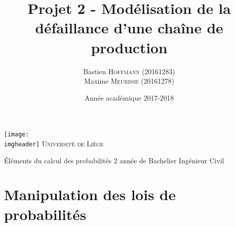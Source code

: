 \documentclass[a4paper, 12pt]{article}
\title{Projet 2 - Modélisation de la défaillance d'une chaîne de production}
\author{Bastien \textsc{Hoffmann} (20161283)\\Maxime \textsc{Meurisse} (20161278)\\}
\date{Année académique 2017-2018}
\newcommand{\imgheader}{resources/pdf/logo-uliege.pdf}
\newcommand{\institution}{Université de Liège}
\newcommand{\subtitle}{Éléments du calcul des probabilités}
\newcommand{\context}{2\ieme{} année de Bachelier Ingénieur Civil}
\begin{document}
	\makeatletter
	\begin{titlepage}
		\begin{minipage}[t][0.425\textheight][t]{\textwidth}
			\begin{center}
				\texttt{[image: \\imgheader]}
				\vfill
				{\huge \textsc{\institution}}
				\vfill
			\end{center}
		\end{minipage}
		\vfill
		\begin{minipage}{\textwidth}
			\hspace{6pt}
			\begin{mdframed}[linewidth = 2pt, innertopmargin = 12pt, innerbottommargin = 12pt, leftline = false, rightline = false]
				\begin{center}
					{\huge \bfseries \@title}
				\end{center}
			\end{mdframed}
			\hspace{6pt}
		\end{minipage}
		\vfill
		\begin{minipage}[b][0.425\textheight][t]{\textwidth}
			\begin{center}
				{\LARGE \subtitle}
				\vfill
				{\large \@author\space}
				\vfill
				{\large \context \\[6pt] \@date}
			\end{center}
		\end{minipage}
	\end{titlepage}
	\makeatother
	\restoregeometry
	\section{Manipulation des lois de probabilités}
\end{document}

